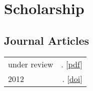 \documentclass[11pt,letterpaper,twoside]{article}
\makeatletter
\newcommand{\myvrule}{\color{lightgray}\vrule width 1.0pt}
\newenvironment{cvsection}{%
  \renewcommand{\arraystretch}{1.75}
  \begin{longtable}[l]{@{} L R @{}}
}{%
  \end{longtable}
}
\makeatother
\begin{document}




\section*{Scholarship}

\subsection*{Journal Articles}

\begin{cvsection}
  under review & \null{}.
  [\href{http://people.linguistics.mcgill.ca/~brian.buccola/files/buccola.spector2015maximality.pdf}{pdf}] \\

  2012 & \null{}.
  [\href{http://dx.doi.org/10.3765/sp}{doi}] \\
\end{cvsection}



\end{document}
